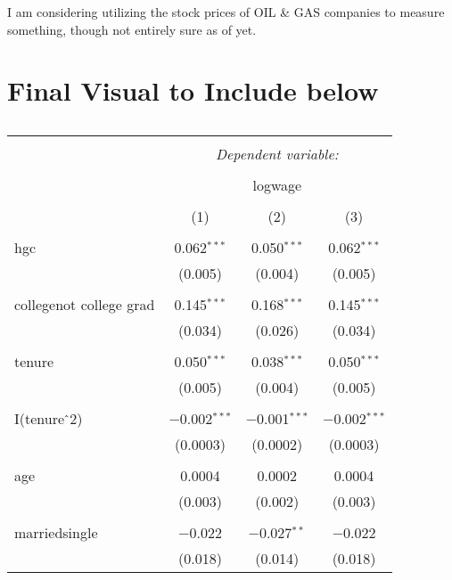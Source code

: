 \documentclass{article}
\begin{document}
I am considering utilizing the stock prices of OIL & GAS companies to measure something, though not entirely sure as of yet.




\section{Final Visual to Include below}
\begin{table}[!htbp] \centering 
  \caption{} 
  \label{} 
\begin{tabular}{@{\extracolsep{5pt}}lccc} 
\\[-1.8ex]\hline 
\hline \\[-1.8ex] 
 & \multicolumn{3}{c}{\textit{Dependent variable:}} \\ 
\cline{2-4} 
\\[-1.8ex] & \multicolumn{3}{c}{logwage} \\ 
\\[-1.8ex] & (1) & (2) & (3)\\ 
\hline \\[-1.8ex] 
 hgc & 0.062$^{***}$ & 0.050$^{***}$ & 0.062$^{***}$ \\ 
  & (0.005) & (0.004) & (0.005) \\ 
  & & & \\ 
 collegenot college grad & 0.145$^{***}$ & 0.168$^{***}$ & 0.145$^{***}$ \\ 
  & (0.034) & (0.026) & (0.034) \\ 
  & & & \\ 
 tenure & 0.050$^{***}$ & 0.038$^{***}$ & 0.050$^{***}$ \\ 
  & (0.005) & (0.004) & (0.005) \\ 
  & & & \\ 
 I(tenure$\hat{\mkern6mu}$2) & $-$0.002$^{***}$ & $-$0.001$^{***}$ & $-$0.002$^{***}$ \\ 
  & (0.0003) & (0.0002) & (0.0003) \\ 
  & & & \\ 
 age & 0.0004 & 0.0002 & 0.0004 \\ 
  & (0.003) & (0.002) & (0.003) \\ 
  & & & \\ 
 marriedsingle & $-$0.022 & $-$0.027$^{**}$ & $-$0.022 \\ 
  & (0.018) & (0.014) & (0.018) \\ 

\end{tabular}
\end{table}
\end{document}
